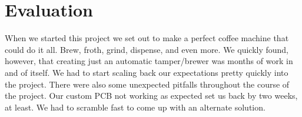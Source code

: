 \documentclass[conference]{IEEEtran}
\begin{document}

\section{Evaluation}
When we started this project we set out to make a perfect coffee machine that
could do it all. Brew, froth, grind, dispense, and even more. We quickly found,
however, that creating just an automatic tamper/brewer was months of work
in and of itself. We had to start scaling back our expectations pretty
quickly into the project. There were also some unexpected pitfalls throughout
the course of the project. Our custom PCB not working as expected set us back by
two weeks, at least. We had to scramble fast to come up with an alternate
solution.
\end{document}
